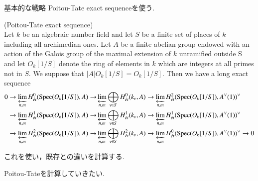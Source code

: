 \documentclass{ujarticle}
\begin{document}
基本的な戦略
Poitou-Tate exact sequenceを使う.
\begin{thm} (Poitou-Tate exact sequence) \\
Let $k$ be an algebraic number field and let $S$ be a finite set of places of $k$ including all archimedian ones.
Let $A$ be a finite abelian group  endowed with an action of  the Galois group of the maximal extension  of $k$ unramified outside S and
let $O_{k}[1/S]$ denote   the ring of elements in $k$ which are integers at all primes not in $S$.
We suppose that $ | A | O_{k}[1/S]=O_{k}[1/S]$.
Then we have a long exact sequence
\begin{equation*}
\begin{split}
0 \rightarrow  \varprojlim\limits_{n,m} H^0_{\acute{e}t}(\mathrm{Spec}(O_{k}[1/S]),A) \rightarrow &\varprojlim\limits_{n,m}\bigoplus\limits_{v \in S}H^0_{\acute{e}t}(k_v,A) \rightarrow \varprojlim\limits_{n,m}H^2_{\acute{e}t}(\mathrm{Spec}(O_k[1/S]),A^{\vee}(1))^{\vee} \\
\rightarrow  \varprojlim\limits_{n,m} H^1_{\acute{e}t}(\mathrm{Spec}(O_{k}[1/S]),A) \rightarrow &\varprojlim\limits_{n,m}\bigoplus\limits_{v \in S}H^1_{\acute{e}t}(k_v,A) \rightarrow \varprojlim\limits_{n,m}H^1_{\acute{e}t}(\mathrm{Spec}(O_k[1/S]),A^{\vee}(1))^{\vee} \\
\rightarrow  \varprojlim\limits_{n,m}H^2_{\acute{e}t}(\mathrm{Spec}(O_{k}[1/S]),A) \rightarrow &\varprojlim\limits_{n,m}\bigoplus\limits_{v \in S}H^2_{\acute{e}t}(k_v,A) \rightarrow \varprojlim\limits_{n,m}H^0_{\acute{e}t}(\mathrm{Spec}(O_k[1/S]),A^{\vee}(1))^{\vee} \rightarrow 0
\end{split}
\end{equation*}
\end{thm}

これを使い，既存との違いを計算する.


Poitou-Tateを計算していきたい.
\end{document}
